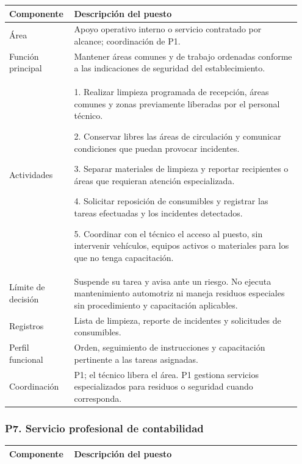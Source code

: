 {\begin{minipage}{\linewidth}
{\begin{tabular}{@{}p{0.20\linewidth}p{0.75\linewidth}@{}}
\textbf{Componente} & \textbf{Descripción del puesto} \\ \midrule
Área & Apoyo operativo interno o servicio contratado por alcance; coordinación de P1. \\ \midrule
Función principal & Mantener áreas comunes y de trabajo ordenadas conforme a las indicaciones de seguridad del establecimiento. \\ \midrule
Actividades & 1. Realizar limpieza programada de recepción, áreas comunes y zonas previamente liberadas por el personal técnico.\par 2. Conservar libres las áreas de circulación y comunicar condiciones que puedan provocar incidentes.\par 3. Separar materiales de limpieza y reportar recipientes o áreas que requieran atención especializada.\par 4. Solicitar reposición de consumibles y registrar las tareas efectuadas y los incidentes detectados.\par 5. Coordinar con el técnico el acceso al puesto, sin intervenir vehículos, equipos activos o materiales para los que no tenga capacitación. \\ \midrule
Límite de decisión & Suspende su tarea y avisa ante un riesgo. No ejecuta mantenimiento automotriz ni maneja residuos especiales sin procedimiento y capacitación aplicables. \\ \midrule
Registros & Lista de limpieza, reporte de incidentes y solicitudes de consumibles. \\ \midrule
Perfil funcional & Orden, seguimiento de instrucciones y capacitación pertinente a las tareas asignadas. \\ \midrule
Coordinación & P1; el técnico libera el área. P1 gestiona servicios especializados para residuos o seguridad cuando corresponda. \\ \midrule
\end{tabular}}\end{minipage}\par\medskip
\par\medskip\noindent\begin{minipage}{\linewidth}\subsubsection*{P7. Servicio profesional de contabilidad}
{\small\renewcommand{\arraystretch}{1.15}\begin{tabular}{@{}p{0.20\linewidth}p{0.75\linewidth}@{}}\toprule
\textbf{Componente} & \textbf{Descripción del puesto} \\ \midrule

\end{tabular}}
\end{minipage}}
